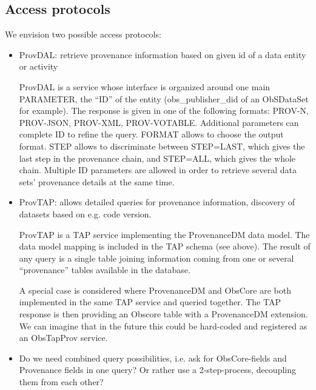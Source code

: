 \subsection{Access protocols}
We envision two possible access protocols:
\begin{itemize}
\item ProvDAL: retrieve provenance information based on given id of a data entity or activity

ProvDAL is a service whose interface is organized around one main PARAMETER, the ``ID'' of the entity (obs\_publisher\_did of an ObSDataSet for example). The response is given in one of the following formats: PROV-N, PROV-JSON, PROV-XML, PROV-VOTABLE. Additional parameters can complete ID to refine the query. FORMAT allows to choose the output format. STEP allows to discriminate between STEP=LAST, which gives the last step in the provenance chain, and STEP=ALL, which gives the whole chain.
Multiple ID parameters are allowed in order to retrieve several data sets' provenance details at the same time.
\item ProvTAP: allows detailed queries for provenance information, discovery of datasets based on 
e.g. code version.

ProvTAP is a TAP service implementing the ProvenanceDM data model. The data model mapping is included in the TAP schema (see above). The result of any query is a single table joining information coming from one or several ``provenance'' tables available in the database. 

A special case is considered where ProvenanceDM and ObsCore are both implemented in the same TAP service and queried together. The TAP response is then providing an Obscore table with a ProvenanceDM extension. We can imagine that in the future this could be hard-coded and registered as an ObsTapProv service. 


\item Do we need combined query possibilities, i.e. ask for ObsCore-fields and Provenance fields
in one query? Or rather use a 2-step-process, decoupling them from each other?
\end{itemize}


